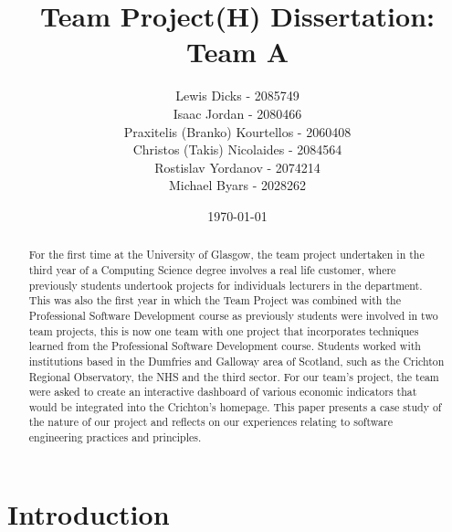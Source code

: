 \documentclass{l3proj}
\begin{document}
\title{Team Project(H) Dissertation: Team A}

\author{Lewis Dicks - 2085749 \\
        Isaac Jordan - 2080466 \\
        Praxitelis (Branko) Kourtellos - 2060408 \\
        Christos (Takis) Nicolaides - 2084564  \\
        Rostislav Yordanov - 2074214 \\
        Michael Byars - 2028262}

\date{\today}

\maketitle

\begin{abstract}

For the first time at the University of Glasgow, the team project undertaken in the third year of a Computing Science
degree involves a real life customer, where previously students undertook projects for individuals lecturers in the
department. This was also the first year in which the Team Project was combined with the Professional Software
Development course as previously students were involved in two team projects, this is now one team with one project that
incorporates techniques learned from the Professional Software Development course. Students worked with institutions
based in the Dumfries and Galloway area of Scotland, such as the Crichton Regional Observatory, the NHS and the third
sector. For our team's project, the team were asked to create an interactive dashboard of various economic indicators that
would be integrated into the Crichton's homepage. This paper presents a case study of the nature of our project and
reflects on our experiences relating to software engineering practices and principles.

\end{abstract}


\newpage

\section{Introduction}
\label{sec:introduction}
\end{document}
